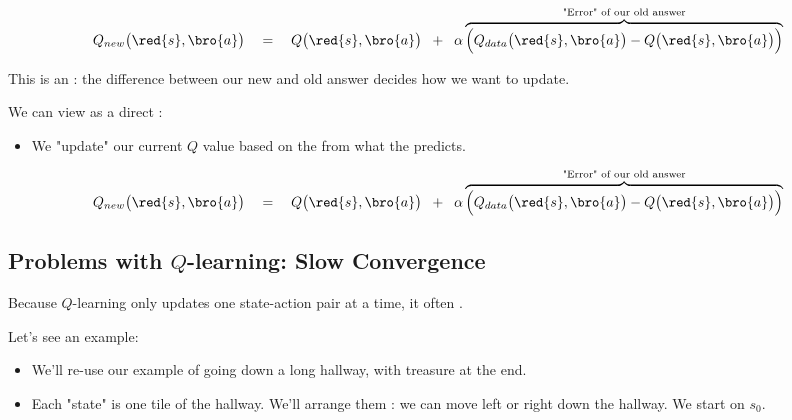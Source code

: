         \begin{equation}
            Q_{new}\big(\red{s},\bro{a} \big) \quad=\quad  
            Q\big(\red{s},\bro{a} \big)
            \;\;+\;\; 
            \alpha
            \overbrace{
            \Big( 
                Q_{data}\big(\red{s},\bro{a} \big) - Q\big(\red{s},\bro{a} \big)   
            \Big)
            }^{\text{"Error" of our old answer}}
        \end{equation}

        This is an : the difference between our new and old answer decides how we want to update.

        \begin{concept}
            We can view  as a direct :
            
            \begin{itemize}
                \item We "update" our current $Q$ value based on the  from what the  predicts.
            \end{itemize}

            \begin{equation*}
                Q_{new}\big(\red{s},\bro{a} \big) \quad=\quad  
                Q\big(\red{s},\bro{a} \big)
                \;\;+\;\; 
                \alpha
                \overbrace{
                \Big( 
                    Q_{data}\big(\red{s},\bro{a} \big) - Q\big(\red{s},\bro{a} \big)   
                \Big)
                }^{\text{"Error" of our old answer}}
            \end{equation*}
        \end{concept}

        


        

        



    \pagebreak

    \subsection{Problems with $Q$-learning: Slow Convergence}

        Because $Q$-learning only updates one state-action pair at a time, it often .

        Let's see an example: 

        \begin{itemize}
            \item \miniex We'll re-use our example of going down a long hallway, with treasure at the end.
            \item Each "state" is one tile of the hallway. We'll arrange them : we can move left or right down the hallway. We start on $s_0$.
        \end{itemize}

